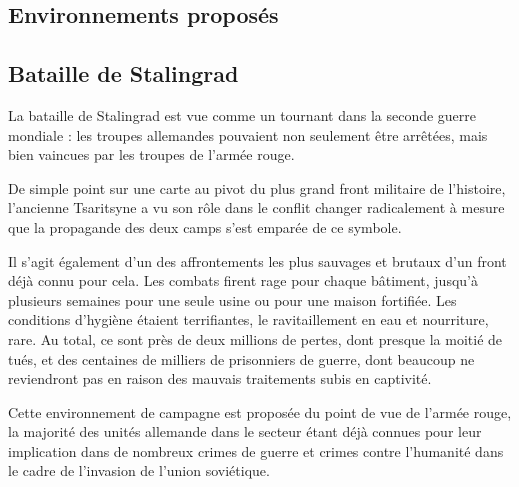 \documentclass{report}
\begin{document}
\begin{multicols}{2}

\chapter{Environnements proposés}
\section{Bataille de Stalingrad}
La bataille de Stalingrad est vue comme un tournant dans la seconde guerre mondiale : les troupes allemandes pouvaient non seulement être arrêtées, mais bien vaincues par les troupes de l'armée rouge.

De simple point sur une carte au pivot du plus grand front militaire de l'histoire, l'ancienne Tsaritsyne a vu son rôle dans le conflit changer radicalement à mesure que la propagande des deux camps s'est emparée de ce symbole.

Il s'agit également d'un des affrontements les plus sauvages et brutaux d'un front déjà connu pour cela. Les combats firent rage pour chaque bâtiment, jusqu'à plusieurs semaines pour une seule usine ou pour une maison fortifiée. Les conditions d'hygiène étaient terrifiantes, le ravitaillement en eau et nourriture, rare. Au total, ce sont près de deux millions de pertes, dont presque la moitié de tués, et des centaines de milliers de prisonniers de guerre, dont beaucoup ne reviendront pas en raison des mauvais traitements subis en captivité.

Cette environnement de campagne est proposée du point de vue de l'armée rouge, la majorité des unités allemande dans le secteur étant déjà connues pour leur implication dans de nombreux crimes de guerre et crimes contre l'humanité dans le cadre de l'invasion de l'union soviétique.

\end{multicols}
\end{document}
